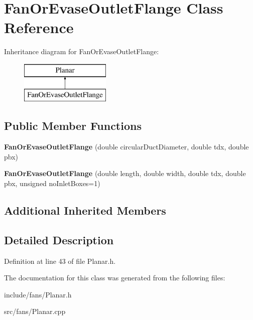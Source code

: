 \hypertarget{class_fan_or_evase_outlet_flange}{}\section{Fan\+Or\+Evase\+Outlet\+Flange Class Reference}
\label{class_fan_or_evase_outlet_flange}
Inheritance diagram for Fan\+Or\+Evase\+Outlet\+Flange\+:\begin{figure}[H]
\begin{center}
\leavevmode
\includegraphics[height=2.000000cm]{d7/de3/class_fan_or_evase_outlet_flange}
\end{center}
\end{figure}
\subsection*{Public Member Functions}
\begin{DoxyCompactItemize}
\item 
\mbox{\label{class_fan_or_evase_outlet_flange_aa5ffe09deb063462d9e1a08ce8ca3e79}} 
{\bfseries Fan\+Or\+Evase\+Outlet\+Flange} (double circular\+Duct\+Diameter, double tdx, double pbx)
\item 
\mbox{\label{class_fan_or_evase_outlet_flange_a50a381091c3c22388a4c7af354444cb7}} 
{\bfseries Fan\+Or\+Evase\+Outlet\+Flange} (double length, double width, double tdx, double pbx, unsigned no\+Inlet\+Boxes=1)
\end{DoxyCompactItemize}
\subsection*{Additional Inherited Members}


\subsection{Detailed Description}


Definition at line 43 of file Planar.\+h.



The documentation for this class was generated from the following files\+:\begin{DoxyCompactItemize}
\item 
include/fans/Planar.\+h\item 
src/fans/Planar.\+cpp\end{DoxyCompactItemize}
